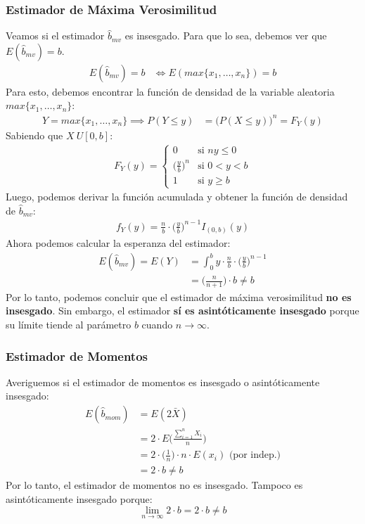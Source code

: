 \subsubsection{Estimador de Máxima Verosimilitud}
Veamos si el estimador $\hat{b}_{mv}$ es insesgado. Para que lo sea, debemos ver que $E(\hat{b}_{mv}) = b$.
\begin{align*}
	E(\hat{b}_{mv}) = b &\iff E(max\{x_1, \dots, x_n\}) = b
\end{align*}
Para esto, debemos encontrar la función de densidad de la variable aleatoria $max\{x_1, \dots, x_n\}$:
\begin{align*}
	Y = max\{x_1, \dots, x_n\} \implies P(Y \leq y) &= \Big( P(X \leq y) \Big)^n = F_{Y}(y)
\end{align*}
Sabiendo que $X~U[0, b]$:
\begin{align*}
	F_{Y}(y) = 
	\begin{cases}
		0 						&\mbox{si } n y \leq 0 \\
		\Big(\frac{y}{b}\Big)^n & \mbox{si } 0 < y < b \\
		1 						& \mbox{si } y \geq b
	\end{cases}
\end{align*}
Luego, podemos derivar la función acumulada y obtener la función de densidad de $\hat{b}_{mv}$:
\begin{align*}
	f_{Y}(y) = \frac{n}{b} \cdot \Big(\frac{y}{b}\Big)^{n - 1} I_{(0, b)}(y)
\end{align*}
Ahora podemos calcular la esperanza del estimador:
\begin{align*}
	E(\hat{b}_{mv}) = E(Y) 	&= \int_{0}^{b}y \cdot \frac{n}{b} \cdot \Big(\frac{y}{b}\Big)^{n - 1} \\
							&= \Big(\frac{n}{n+1}\Big) \cdot b \neq b
\end{align*}
Por lo tanto, podemos concluir que el estimador de máxima verosimilitud \textbf{no es insesgado}. Sin embargo, el estimador \textbf{sí es asintóticamente insesgado} porque su límite tiende al parámetro $b$ cuando $n \rightarrow \infty$.

\subsubsection{Estimador de Momentos}
Averiguemos si el estimador de momentos es insesgado o asintóticamente insesgado:
\begin{align*}
	E(\hat{b}_{mom}) &= E(2\bar{X}) \\
	 	 			 &= 2 \cdot E\Big(\frac{\sum_{i=1}^{n}X_{i}}{n}\Big) \\
	 	 			 &= 2 \cdot \Big(\frac{1}{n}\Big) \cdot n \cdot E(x_{i}) \text{ (por indep.)}\\
	 	 			 &= 2 \cdot b \neq b
\end{align*}
Por lo tanto, el estimador de momentos no es insesgado. Tampoco es asintóticamente insesgado porque:
\begin{displaymath}
\lim_{n \to \infty} 2 \cdot b = 2 \cdot b \neq b
\end{displaymath}


